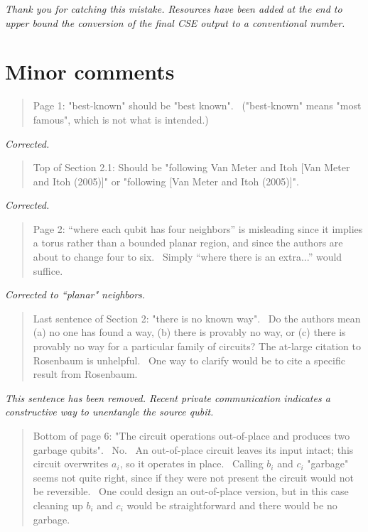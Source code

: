 \documentclass{article}
\theoremstyle{plain} \newtheorem{lemma}{Lemma}
\begin{document}
{\it Thank you for catching this mistake. Resources have been added at the
end to upper bound the conversion of the final CSE output to a conventional
number.}

\section{Minor comments}

\begin{quote}
Page 1: "best-known" should be "best known".  ("best-known" means
"most famous", which is not what is intended.)
\end{quote}

{\it Corrected.}

\begin{quote}
Top of Section 2.1: Should be "following Van Meter and Itoh [Van Meter
and Itoh (2005)]" or "following [Van Meter and Itoh (2005)]".
\end{quote}

{\it Corrected.}

\begin{quote}
Page 2: ``where each qubit has four neighbors'' is misleading since it
implies a torus rather than a bounded planar region, and since the authors
are about to change four to six.  Simply ``where there is an extra...''
would suffice.
\end{quote}

{\it Corrected to ``planar" neighbors.}

\begin{quote}
Last sentence of Section 2: "there is no known way".  Do the authors
mean (a) no one has found a way, (b) there is provably no way, or
(c) there is provably no way for a particular family of circuits? The
at-large citation to Rosenbaum is unhelpful.  One way to clarify would be
to cite a specific result from Rosenbaum.
\end{quote}

{\it This sentence has been removed.  Recent private communication indicates a
constructive way to unentangle the source qubit.}

\begin{quote}
Bottom of page 6: "The circuit operations out-of-place and produces
two garbage qubits".  No.  An out-of-place circuit leaves its input intact;
this circuit overwrites $a_i$, so it operates in place.  Calling $b_i$ and
$c_i$ "garbage" seems not quite right, since if they were not present the
circuit would not be reversible.  One could design an out-of-place version,
but in this case cleaning up $b_i$ and $c_i$ would be straightforward and
there would be no garbage.
\end{quote}
\end{document}
